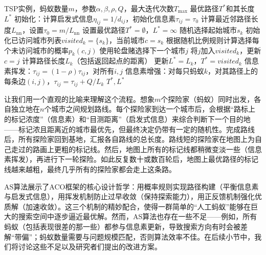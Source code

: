 \documentclass[lang=cn,zihao=-4,a4paper,fontset=windows]{beautybook}
\begin{document}
\begin{algorithm}[H]
\caption{基本蚁群系统（Ant System, AS）算法}
\begin{algorithmic}[1]
\REQUIRE TSP实例，蚂蚁数量$m$，参数$\alpha, \beta, \rho, Q$，最大迭代次数$T_{\max}$
\ENSURE 最优路径$T^*$和其长度$L^*$
\STATE 初始化：计算启发式信息$\eta_{ij} = 1/d_{ij}$，初始化信息素$\tau_{ij} = \tau_0$
\STATE 计算最近邻路径长度$L_{\text{nn}}$，设置$\tau_0 = m/L_{\text{nn}}$
\STATE 设置最优路径$T^* = \emptyset$，$L^* = \infty$
        \STATE 随机选择起始城市$s_k$
        \STATE 初始化已访问城市列表$visited_k = \{s_k\}$，当前城市$c = s_k$
            \STATE 根据随机比例规则计算选择每个未访问城市的概率$p_k(c,j)$
            \STATE 使用轮盘赌选择下一个城市$j$
            \STATE 将$j$加入$visited_k$，更新$c = j$
        \ENDWHILE
        \STATE 计算路径长度$L_k$（包括返回起点的距离）
            \STATE 更新$L^* = L_k$，$T^* = visited_k$
        \ENDIF
    \ENDFOR
    \STATE 信息素挥发：$\tau_{ij} = (1-\rho)\tau_{ij}$，对所有$i,j$
    \STATE 信息素增强：对每只蚂蚁$k$，对其路径上的每条边$(i,j)$，$\tau_{ij} = \tau_{ij} + Q/L_k$
\ENDFOR
\RETURN $T^*, L^*$
\end{algorithmic}
\end{algorithm}

让我们用一个直观的比喻来理解这个流程。想象$m$个探险家（蚂蚁）同时出发，各自独立地在$n$个城市之间规划路线。每个探险家到达一个城市后，会根据“路标上的标记浓度”（信息素）和“目测距离”（启发式信息）来综合判断下一个目的地——标记浓且距离近的城市最优先，但最终决定仍带有一定的随机性。完成路线后，所有探险家回到基地，汇报各自路线的总长度。路线短的探险家在地图上为自己走过的路画上更粗的标记线。然后，地图上所有的标记线都稍微变淡一些（信息素挥发），再进行下一轮探险。如此反复数十或数百轮后，地图上最优路径的标记线越来越粗，最终几乎所有的探险家都会走上这条路。

\begin{fancybox}
AS算法展示了ACO框架的核心设计哲学：用概率规则实现路径构建（平衡信息素与启发式信息），用挥发机制防止过早收敛（保持探索能力），用正反馈机制强化优质解（加速收敛）。这三个机制的精妙配合，使得一群简单的“人工蚂蚁”能够在巨大的搜索空间中逐步逼近最优解。然而，AS算法也存在一些不足——例如，所有蚂蚁（包括表现很差的那一些）都参与信息素更新，导致搜索方向有时会被差解“带偏”；蚂蚁数量需要与问题规模匹配，否则算法效率不佳。在后续小节中，我们将讨论这些不足以及研究者们提出的改进方案。
\end{fancybox}
\end{document}
